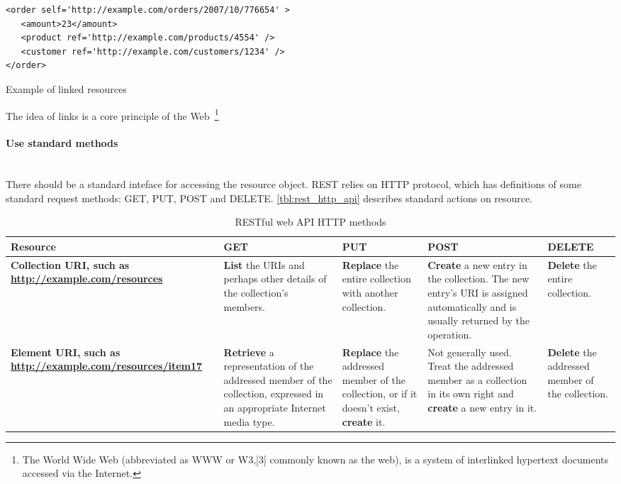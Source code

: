 \begin{listing}[H]
\begin{verbatim}
<order self='http://example.com/orders/2007/10/776654' > 
   <amount>23</amount> 
   <product ref='http://example.com/products/4554' /> 
   <customer ref='http://example.com/customers/1234' /> 
</order> 
\end{verbatim}
\caption{Example of linked resources\cite{rest_brief_intro}}
\label{lst:linked_uri_example}
\end{listing}
 
The idea of links is a core principle of the Web~\footnote{The World Wide Web
(abbreviated as WWW or W3,[3] commonly known as the web), is a system of
interlinked hypertext documents accessed via the Internet.\cite{wikipedia:WWW}}

\paragraph{Use standard methods} ~\\

There should be a standard inteface for accessing the resource object.
REST relies on HTTP protocol, which has definitions of some standard request
methods:
GET, PUT, POST and DELETE.
\autoref{tbl:rest_http_api} describes standard actions on resource.

\begin{table}[h]
	\centering	
	\begin{tabularx}{\textwidth}{|X|X|X|X|X|}
		\hline
		\textbf{Resource} & 
		\textbf{GET}  	& 
		\textbf{PUT} 	&
		\textbf{POST} &
		\textbf{DELETE}
	    
	    \tabularnewline
		\hline
			\begin{sloppypar}
				\textbf{Collection URI, such as \url{http://example.com/resources}}
			\end{sloppypar} &
			\textbf{List} the URIs and perhaps other details of the collection's members.&
			\textbf{Replace} the entire collection with another collection.&
			\textbf{Create} a new entry in the collection. The new entry's URI is
			assigned automatically and is usually returned by the operation. &
			\textbf{Delete} the entire collection.
			
	    	\tabularnewline	    	
	    	\hline
	    	\begin{sloppypar}
				\textbf{Element URI, such as \url{http://example.com/resources/item17}} 
			\end{sloppypar} &
			\textbf{Retrieve} a representation of the addressed member of the
			collection, expressed in an appropriate Internet media type. &
			\textbf{Replace} the addressed member of the collection, or if it
			doesn't exist, \textbf{create} it. &			
			Not generally used. Treat the addressed member as a collection in its own
			right and \textbf{create} a new entry in it. &			
			\textbf{Delete} the addressed member of the collection.
	
	    \tabularnewline
		\hline	  
	\end{tabularx} 
	\caption{RESTful web API HTTP methods \cite{wikipedia:REST}}
	\label{tbl:rest_http_api}
\end{table}

